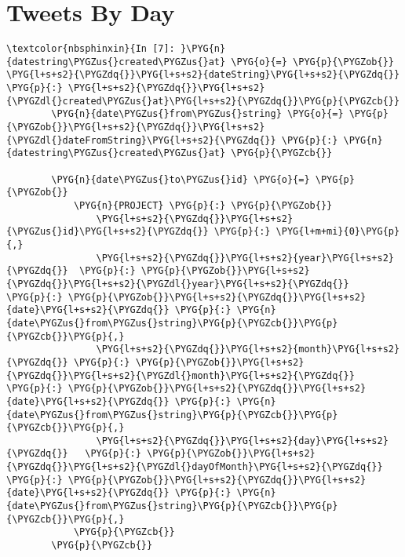 \documentclass[letterpaper,10pt,english]{sphinxmanual}
\begin{document}
\section{Tweets By Day}
\label{\detokenize{04-mongo/04-04-time-and-space:Tweets-By-Day}}\label{\detokenize{04-mongo/04-04-time-and-space::doc}}
%
\begin{Verbatim}[commandchars=\\\{\}]
\textcolor{nbsphinxin}{In [7]: }\PYG{n}{datestring\PYGZus{}created\PYGZus{}at} \PYG{o}{=} \PYG{p}{\PYGZob{}} \PYG{l+s+s2}{\PYGZdq{}}\PYG{l+s+s2}{dateString}\PYG{l+s+s2}{\PYGZdq{}} \PYG{p}{:} \PYG{l+s+s2}{\PYGZdq{}}\PYG{l+s+s2}{\PYGZdl{}created\PYGZus{}at}\PYG{l+s+s2}{\PYGZdq{}}\PYG{p}{\PYGZcb{}}
        \PYG{n}{date\PYGZus{}from\PYGZus{}string} \PYG{o}{=} \PYG{p}{\PYGZob{}}\PYG{l+s+s2}{\PYGZdq{}}\PYG{l+s+s2}{\PYGZdl{}dateFromString}\PYG{l+s+s2}{\PYGZdq{}} \PYG{p}{:} \PYG{n}{datestring\PYGZus{}created\PYGZus{}at} \PYG{p}{\PYGZcb{}}
        
        \PYG{n}{date\PYGZus{}to\PYGZus{}id} \PYG{o}{=} \PYG{p}{\PYGZob{}}
            \PYG{n}{PROJECT} \PYG{p}{:} \PYG{p}{\PYGZob{}}
                \PYG{l+s+s2}{\PYGZdq{}}\PYG{l+s+s2}{\PYGZus{}id}\PYG{l+s+s2}{\PYGZdq{}} \PYG{p}{:} \PYG{l+m+mi}{0}\PYG{p}{,}
                \PYG{l+s+s2}{\PYGZdq{}}\PYG{l+s+s2}{year}\PYG{l+s+s2}{\PYGZdq{}}  \PYG{p}{:} \PYG{p}{\PYGZob{}}\PYG{l+s+s2}{\PYGZdq{}}\PYG{l+s+s2}{\PYGZdl{}year}\PYG{l+s+s2}{\PYGZdq{}}       \PYG{p}{:} \PYG{p}{\PYGZob{}}\PYG{l+s+s2}{\PYGZdq{}}\PYG{l+s+s2}{date}\PYG{l+s+s2}{\PYGZdq{}} \PYG{p}{:} \PYG{n}{date\PYGZus{}from\PYGZus{}string}\PYG{p}{\PYGZcb{}}\PYG{p}{\PYGZcb{}}\PYG{p}{,}
                \PYG{l+s+s2}{\PYGZdq{}}\PYG{l+s+s2}{month}\PYG{l+s+s2}{\PYGZdq{}} \PYG{p}{:} \PYG{p}{\PYGZob{}}\PYG{l+s+s2}{\PYGZdq{}}\PYG{l+s+s2}{\PYGZdl{}month}\PYG{l+s+s2}{\PYGZdq{}}      \PYG{p}{:} \PYG{p}{\PYGZob{}}\PYG{l+s+s2}{\PYGZdq{}}\PYG{l+s+s2}{date}\PYG{l+s+s2}{\PYGZdq{}} \PYG{p}{:} \PYG{n}{date\PYGZus{}from\PYGZus{}string}\PYG{p}{\PYGZcb{}}\PYG{p}{\PYGZcb{}}\PYG{p}{,}
                \PYG{l+s+s2}{\PYGZdq{}}\PYG{l+s+s2}{day}\PYG{l+s+s2}{\PYGZdq{}}   \PYG{p}{:} \PYG{p}{\PYGZob{}}\PYG{l+s+s2}{\PYGZdq{}}\PYG{l+s+s2}{\PYGZdl{}dayOfMonth}\PYG{l+s+s2}{\PYGZdq{}} \PYG{p}{:} \PYG{p}{\PYGZob{}}\PYG{l+s+s2}{\PYGZdq{}}\PYG{l+s+s2}{date}\PYG{l+s+s2}{\PYGZdq{}} \PYG{p}{:} \PYG{n}{date\PYGZus{}from\PYGZus{}string}\PYG{p}{\PYGZcb{}}\PYG{p}{\PYGZcb{}}\PYG{p}{,}
            \PYG{p}{\PYGZcb{}}
        \PYG{p}{\PYGZcb{}}
        

\end{Verbatim}
\end{document}
